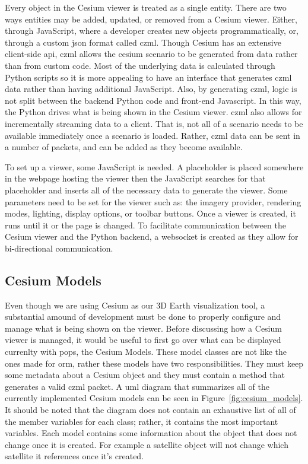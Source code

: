 Every object in the Cesium viewer is treated as a single entity. There are two
ways entities may be added, updated, or removed from a Cesium viewer. Either,
through JavaScript, where a developer creates new objects programmatically, or,
through a custom \gls{json} format called \gls{czml}. Though Cesium has an
extensive client-side \gls{api}, \gls{czml} allows the cesium scenario to be
generated from data rather than from custom code. Most of the underlying data
is calculated through Python scripts so it is more appealing to have an
interface that generates \gls{czml} data rather than having additional
JavaScript. Also, by generating \gls{czml}, logic is not split between the
backend Python code and front-end Javascript. In this way, the Python drives
what is being shown in the Cesium viewer. \gls{czml} also allows for
incrementally streaming data to a client. That is, not all of a scenario needs
to be available immediately once a scenario is loaded. Rather, \gls{czml} data
can be sent in a number of packets, and can be added as they become available.

To set up a viewer, some JavaScript is needed. A placeholder is placed
somewhere in the webpage hosting the viewer then the JavaScript searches for
that placeholder and inserts all of the necessary data to generate the viewer.
Some parameters need to be set for the viewer such as: the imagery provider,
rendering modes, lighting, display options, or toolbar buttons. Once a viewer
is created, it runs until it or the page is changed.  To facilitate
communication between the Cesium viewer and the Python backend, a websocket is
created as they allow for bi-directional communication. 

\subsection{Cesium Models}

Even though we are using Cesium as our 3D Earth visualization tool, a
substantial amound of development must be done to properly configure and manage
what is being shown on the viewer. Before discussing how a Cesium viewer is
managed, it would be useful to first go over what can be displayed currenlty
with \gls{pops}, the Cesium Models. These model classes are not like the ones
made for \gls{orm}, rather these models have two responsibilities. They must
keep some metadata about a Cesium object and they must contain a method that
generates a valid \gls{czml} packet.  A \gls{uml} diagram that summarizes all
of the currently implemented Cesium models can be seen in
Figure~\ref{fig:cesium_models}. It should be noted that the diagram does not
contain an exhaustive list of all of the member variables for each class;
rather, it contains the most important variables.  Each model contains some
information about the object that does not change once it is created. For
example a satellite object will not change which satellite it references once
it's created. 


